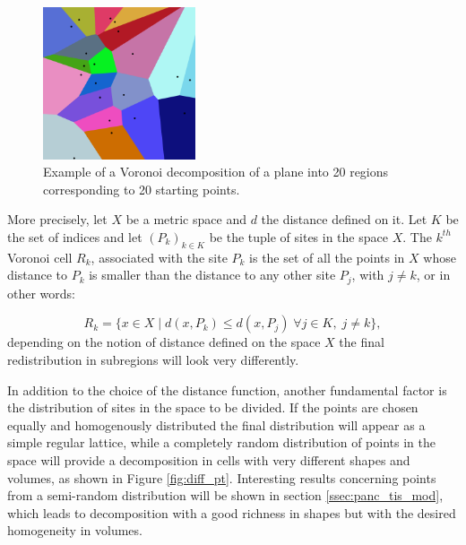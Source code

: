 \documentclass[12pt,a4paper]{report}
\begin{document}
    \begin{figure}
        \centering
        \includegraphics[width = 0.4\textwidth]{images/vor_20}
        \caption{Example of a Voronoi decomposition of a plane into 20 regions corresponding to 20 starting points.}
        \label{fig:vor_20}
    \end{figure}

    More precisely, let $X$ be a metric space and $d$ the distance defined on it. Let $K$ be the set of indices and let $(P_k)_{k\in K}$ be the tuple of sites in the space $X$. The $k^{th}$ Voronoi cell $R_k$, associated with the site $P_k$ is the set of all the points in $X$ whose distance to $P_k$ is smaller than the distance to any other site $P_j$, with $j\neq k$, or in other words:

    \begin{equation}
        R_k = \{x \in X\;|\;d(x,P_k) \le d(x,P_j)\; \forall j \in K, \;j\neq k \}, \label{eq:formal_Vor_def}
    \end{equation}
    depending on the notion of distance defined on the space $X$ the final redistribution in subregions will look very differently.

    In addition to the choice of the distance function, another fundamental factor is the distribution of sites in the space to be divided. If the points are chosen equally and homogenously distributed the final distribution will appear as a simple regular lattice, while a completely random distribution of points in the space will provide a decomposition in cells with very different shapes and volumes, as shown in Figure \ref{fig:diff_pt}. Interesting results concerning points from a semi-random distribution will be shown in section \ref{ssec:panc_tis_mod}, which leads to decomposition with a good richness in shapes but with the desired homogeneity in volumes.
\end{document}
